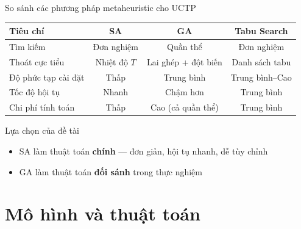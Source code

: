 \documentclass[aspectratio=169,10pt]{beamer}
\begin{document}
\begin{frame}{So sánh các phương pháp metaheuristic cho UCTP}
\begin{table}
\centering
\small
\begin{tabular}{@{}lccc@{}}
\toprule
\textbf{Tiêu chí} & \textbf{SA} & \textbf{GA} & \textbf{Tabu Search} \\
\midrule
Tìm kiếm & Đơn nghiệm & Quần thể & Đơn nghiệm \\
Thoát cực tiểu & Nhiệt độ $T$ & Lai ghép + đột biến & Danh sách tabu \\
Độ phức tạp cài đặt & Thấp & Trung bình & Trung bình--Cao \\
Tốc độ hội tụ & Nhanh & Chậm hơn & Trung bình \\
Chi phí tính toán & Thấp & Cao (cả quần thể) & Trung bình \\
\bottomrule
\end{tabular}
\end{table}

\vspace{0.3cm}
\begin{block}{Lựa chọn của đề tài}
\begin{itemize}
  \item SA làm thuật toán \textbf{chính} --- đơn giản, hội tụ nhanh, dễ tùy chỉnh
  \item GA làm thuật toán \textbf{đối sánh} trong thực nghiệm
\end{itemize}
\end{block}
\end{frame}

\section{Mô hình và thuật toán}
\end{document}
